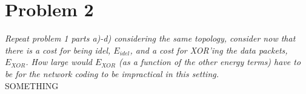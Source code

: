 \section{Problem 2}
\textit{Repeat problem 1 parts a)-d) considering the same topology, consider now that there is a cost for being idel, $E_{idel}$, and a cost for XOR'ing the data packets, $E_{XOR}$. How large would $E_{XOR}$ (as a function of the other energy terms) have to be for the network coding to be impractical in this setting.}\\

SOMETHING